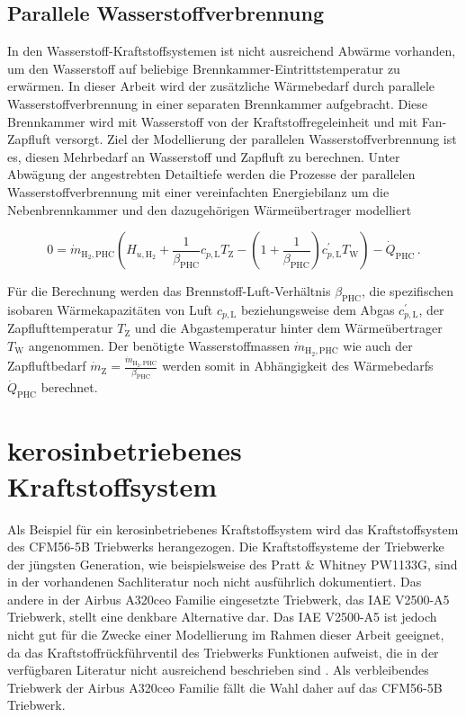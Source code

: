 \subsection{Parallele Wasserstoffverbrennung}

In den Wasserstoff-Kraftstoffsystemen ist nicht ausreichend Abwärme vorhanden, um den Wasserstoff auf beliebige Brennkammer-Eintrittstemperatur zu erwärmen. In dieser Arbeit wird der zusätzliche Wärmebedarf durch parallele Wasserstoffverbrennung in einer separaten Brennkammer aufgebracht. Diese Brennkammer wird mit Wasserstoff von der Kraftstoffregeleinheit und mit Fan-Zapfluft versorgt. Ziel der Modellierung der parallelen Wasserstoffverbrennung ist es, diesen Mehrbedarf an Wasserstoff und Zapfluft zu berechnen. Unter Abwägung der angestrebten Detailtiefe werden die Prozesse der parallelen Wasserstoffverbrennung mit einer vereinfachten Energiebilanz um die Nebenbrennkammer und den dazugehörigen Wärmeübertrager modelliert 


\begin{equation}\label{Eq:phc}
	0 = \dot{m}_{\mathrm{H}_2, \mathrm{PHC}}\left(H_{u, \mathrm{H}_2} + \frac{1}{\beta_\mathrm{PHC}}c_{p,\mathrm{L}} T_\mathrm{Z} - \left(1+\frac{1}{\beta_\mathrm{PHC}}\right)c_{p,\mathrm{L}}^{'} T_\mathrm{W}\right)-\dot{Q}_\mathrm{PHC}\,.
\end{equation}

Für die Berechnung werden das Brennstoff-Luft-Verhältnis $\beta_\mathrm{PHC}$, die spezifischen isobaren Wärmekapazitäten von Luft $c_{p,\mathrm{L}}$ beziehungsweise dem Abgas $c_{p,\mathrm{L}}^{'}$, der Zapflufttemperatur $T_\mathrm{Z}$ und die Abgastemperatur hinter dem Wärmeübertrager $T_\mathrm{W}$ angenommen. Der benötigte Wasserstoffmassen $\dot{m}_{\mathrm{H}_2, \mathrm{PHC}}$ wie auch der Zapfluftbedarf $\dot{m}_\mathrm{Z} = \frac{\dot{m}_{\mathrm{H}_2, \mathrm{PHC}}}{\beta_\mathrm{PHC}}$ werden somit in Abhängigkeit des Wärmebedarfs $\dot{Q}_\mathrm{PHC}$ berechnet.

\section{kerosinbetriebenes Kraftstoffsystem}

Als Beispiel für ein kerosinbetriebenes Kraftstoffsystem wird das Kraftstoffsystem des CFM56-5B Triebwerks herangezogen. Die Kraftstoffsysteme der Triebwerke der jüngsten Generation, wie beispielsweise des Pratt \& Whitney PW1133G, sind in der vorhandenen Sachliteratur noch nicht ausführlich dokumentiert. Das andere in der Airbus A320ceo Familie eingesetzte Triebwerk, das IAE V2500-A5 Triebwerk, stellt eine denkbare Alternative dar. Das IAE V2500-A5 ist jedoch nicht gut für die Zwecke einer Modellierung im Rahmen dieser Arbeit geeignet, da das Kraftstoffrückführventil des  Triebwerks Funktionen aufweist, die in der verfügbaren Literatur nicht ausreichend beschrieben sind \cite{LinkeDiesinger.2014}. Als verbleibendes Triebwerk der Airbus A320ceo Familie fällt die Wahl daher auf das CFM56-5B Triebwerk. 

